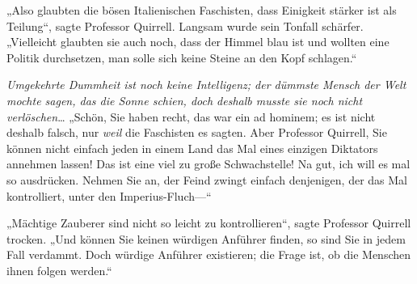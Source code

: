 „Also glaubten die bösen Italienischen Faschisten, dass Einigkeit stärker ist als Teilung“, sagte Professor Quirrell. Langsam wurde sein Tonfall schärfer. „Vielleicht glaubten sie auch noch, dass der Himmel blau ist und wollten eine Politik durchsetzen, man solle sich keine Steine an den Kopf schlagen.“

\emph{Umgekehrte Dummheit ist noch keine Intelligenz; der dümmste Mensch der Welt mochte sagen, das die Sonne schien, doch deshalb musste sie noch nicht verlöschen}…%
„Schön, Sie haben recht, das war ein ad hominem; es ist nicht deshalb falsch, nur \emph{weil} die Faschisten es sagten. Aber Professor Quirrell, Sie können nicht einfach jeden in einem Land das Mal eines einzigen Diktators annehmen lassen! Das ist eine viel zu große Schwachstelle!%
Na gut, ich will es mal so ausdrücken. Nehmen Sie an, der Feind zwingt einfach denjenigen, der das Mal kontrolliert, unter den Imperius-Fluch—“

„Mächtige Zauberer sind nicht so leicht zu kontrollieren“, sagte Professor Quirrell trocken. „Und können Sie keinen würdigen Anführer finden, so sind Sie in jedem Fall verdammt. Doch würdige Anführer existieren; die Frage ist, ob die Menschen ihnen folgen werden.“

